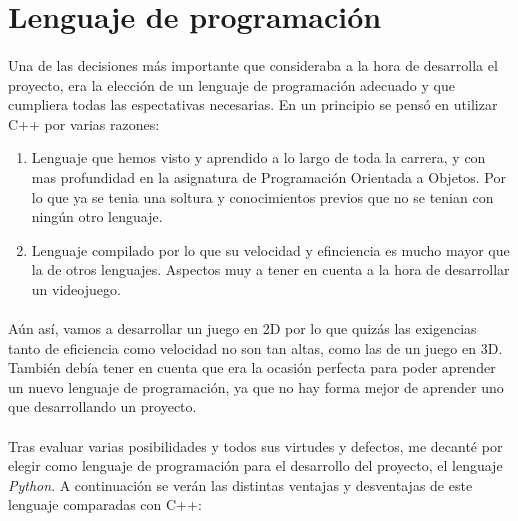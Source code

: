 \section{Lenguaje de programación}

\paragraph{}
Una de las decisiones más importante que consideraba a la hora de desarrolla el proyecto, era la elección de un lenguaje de 
programación adecuado y que cumpliera todas las espectativas necesarias. En un principio se pensó en utilizar C++ por varias 
razones:

\begin{enumerate}
    \item Lenguaje que hemos visto y aprendido a lo largo de toda la carrera, y con mas profundidad en la asignatura de Programación
    Orientada a Objetos. Por lo que ya se tenia una soltura y conocimientos previos que no se tenian con ningún otro lenguaje.
    
    \item Lenguaje compilado por lo que su velocidad y efinciencia es mucho mayor que la de otros lenguajes. Aspectos 
    muy a tener en cuenta a la hora de desarrollar un videojuego.
\end{enumerate}

\paragraph{}
Aún así, vamos a desarrollar un juego en 2D por lo que quizás las exigencias tanto de eficiencia como velocidad no son tan altas,
como las de un juego en 3D. También debía tener en cuenta que era la ocasión perfecta para poder aprender un nuevo lenguaje de 
programación, ya que no hay forma mejor de aprender uno que desarrollando un proyecto.

\paragraph{}
Tras evaluar varias posibilidades y todos sus virtudes y defectos, me decanté por elegir como lenguaje de programación para el 
desarrollo del proyecto, el lenguaje \emph{Python}. A continuación se verán las distintas ventajas y desventajas de este lenguaje 
comparadas con C++:

